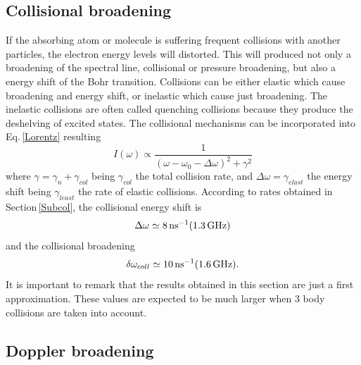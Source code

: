 \subsection{Collisional broadening}
If the absorbing atom or molecule is suffering frequent collisions with another particles, the electron energy levels will distorted. This will produced not only a broadening of the spectral line, collisional or pressure broadening, but also a energy shift of the Bohr transition. Collisions can be either elastic which cause broadening and energy shift, or inelastic which cause just broadening. The inelastic collisions are often called quenching collisions because they produce the deshelving of excited states. The collisional mechanisms can be incorporated into Eq.\,\ref{Lorentz} resulting
\begin{equation}
\label{Lorentz}
I(\omega)\propto\frac{1}{(\omega-\omega_0-\Delta\omega)^2+\gamma^2}
\end{equation}
where $\gamma=\gamma_n+\gamma_{col}$ being $\gamma_{col}$ the total collision rate, and $\Delta\omega=\gamma_{elast}$ the energy shift being $\gamma_{least}$ the rate of elastic collisions. According to rates obtained in Section\,\ref{Subcol}, the collisional energy shift is
\begin{equation}
\Delta\omega\simeq8\,\text{ns$^{-1}$} (1.3\,\text{GHz})
\end{equation}
and the collisional broadening
\begin{equation}
\delta\omega_{coll}\simeq10\,\text{ns$^{-1}$} (1.6\,\text{GHz}).
\end{equation}
It is important to remark that the results obtained in this section are just a first approximation. These values are expected to be much larger when 3 body collisions are taken into account. 

\subsection{Doppler broadening}

